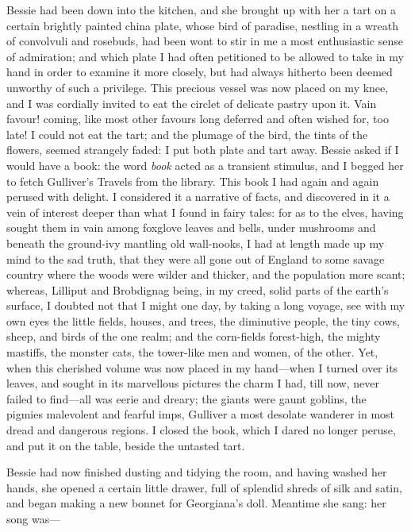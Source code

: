 Bessie had been down into the kitchen, and she brought up with her a
tart on a certain brightly painted china plate, whose bird of paradise,
nestling in a wreath of convolvuli and rosebuds, had been wont to stir
in me a most enthusiastic sense of admiration; and which plate I had
often petitioned to be allowed to take in my hand in order to examine it
more closely, but had always hitherto been deemed unworthy of such a
privilege.  This precious vessel was now placed on my knee, and I was
cordially invited to eat the circlet of delicate pastry upon it.  Vain
favour! coming, like most other favours long deferred and often wished
for, too late!  I could not eat the tart; and the plumage of the bird,
the tints of the flowers, seemed strangely faded: I put both plate and
tart away.  Bessie asked if I would have a book: the word \emph{book}
acted as a transient stimulus, and I begged her to fetch Gulliver's
Travels from the library.  This book I had again and again perused with
delight.  I considered it a narrative of facts, and discovered in it a
vein of interest deeper than what I found in fairy tales: for as to the
elves, having sought them in vain among foxglove leaves and bells, under
mushrooms and beneath the ground-ivy mantling old wall-nooks, I had at
length made up my mind to the sad truth, that they were all gone out of
England to some savage country where the woods were wilder and thicker,
and the population more scant; whereas, Lilliput and Brobdignag being,
in my creed, solid parts of the earth's surface, I doubted not that I
might one day, by taking a long voyage, see with my own eyes the little
fields, houses, and trees, the diminutive people, the tiny cows, sheep,
and birds of the one realm; and the corn-fields forest-high, the mighty
mastiffs, the monster cats, the tower-like men and women, of the other.
Yet, when this cherished volume was now placed in my hand---when I
turned over its leaves, and sought in its marvellous pictures the charm
I had, till now, never failed to find---all was eerie and dreary; the
giants were gaunt goblins, the pigmies malevolent and fearful imps,
Gulliver a most desolate wanderer in most dread and dangerous regions.
I closed the book, which I dared no longer peruse, and put it on the
table, beside the untasted tart.

Bessie had now finished dusting and tidying the room, and having washed
her hands, she opened a certain little drawer, full of splendid shreds
of silk and satin, and began making a new bonnet for Georgiana's doll.
Meantime she sang: her song was---

